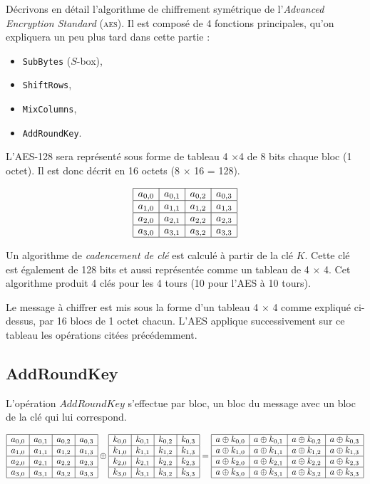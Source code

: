 \def\tabShift#1{
    \begin{array}{|c|c|c|c|} \hline
  #1_{0,0} & #1_{0,1} & #1_{0,2} & #1_{0,3} \\ \hline
  #1_{1,1} & #1_{1,2} & #1_{1,3} & #1_{1,0} \\ \hline
  #1_{2,2} & #1_{2,3} & #1_{2,0} & #1_{2,1} \\ \hline
  #1_{3,3} & #1_{3,0} & #1_{3,1} & #1_{3,2} \\ \hline
  \end{array}
}

\def\Sbox{
}


Décrivons en détail l'algorithme de chiffrement
symétrique de l'\emph{Advanced Encryption
Standard} (\textsc{aes}). Il est composé de 4 fonctions principales, qu'on expliquera un peu plus tard dans cette partie :
\begin{itemize}
\item \texttt{SubBytes} ($S$-box),
\item \texttt{ShiftRows},
\item \texttt{MixColumns},
\item \texttt{AddRoundKey}.
\end{itemize}

L'AES-128 sera représenté sous forme de tableau 4 $\times$4 de 8 bits chaque bloc (1 octet). Il est donc décrit en 16 octets (8 $\times$ 16 = 128).

$$ \TABgen{a} $$


Un algorithme de \emph{cadencement de clé} est calculé à  partir de la clé $K$. Cette clé est également de 128 bits et aussi représentée comme un tableau de 4 $\times$ 4. Cet algorithme produit 4 clés pour les 4 tours (10 pour l'AES à 10 tours).

Le message à chiffrer est mis sous la forme d'un tableau 4 $\times$ 4 comme expliqué ci-dessus, par 16 blocs de 1 octet chacun. L'AES applique successivement sur ce tableau les opérations citées précédemment. 

\subsection{AddRoundKey}
L'opération $AddRoundKey$ s'effectue par bloc, un bloc du message avec un bloc de la clé qui lui correspond.

$$ \TABgen{a} \oplus  \TABgen{k} = \TABgen{a \oplus k} $$

